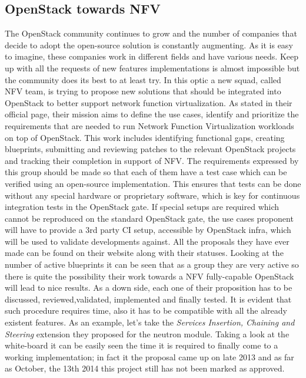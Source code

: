 \subsection{OpenStack towards NFV}
The OpenStack community continues to grow and the number of companies that decide to adopt the open-source solution is constantly augmenting. As it is easy to imagine, these companies work in different fields and have various needs. Keep up with all the requests of new features implementations is almost impossible but the community does its best to at least try. In this optic a new squad, called NFV team, is trying to propose new solutions that should be integrated into OpenStack to better support network function virtualization.
As stated in their official page\cite{NFVteam}, their mission aims to define the use cases, identify and prioritize the requirements that are needed to run Network Function Virtualization workloads on top of OpenStack. This work includes identifying functional gaps, creating blueprints, submitting and reviewing patches to the relevant OpenStack projects and tracking their completion in support of NFV. The requirements expressed by this group should be made so that each of them have a test case which can be verified using an open-source implementation. This ensures that tests can be done without any special hardware or proprietary software, which is key for continuous integration tests in the OpenStack gate. If special setups are required which cannot be reproduced on the standard OpenStack gate, the use cases proponent will have to provide a 3rd party CI setup, accessible by OpenStack infra, which will be used to validate developments against. All the proposals they have ever made can be found on their website\cite{NFVteam} along with their statuses. Looking at the number of active blueprints it can be seen that as a group they are very active so there is quite the possibility their work towards a NFV fully-capable OpenStack will lead to nice results. As a down side, each one of their proposition has to be discussed, reviewed,validated, implemented and finally tested. It is evident that such procedure requires time, also it has to be compatible with all the already existent features.
As an example, let's take the \textit{Services Insertion, Chaining and Steering}\cite{neutronsteeringofficial} extension they proposed for the neutron module. Taking a look at the white-board it can be easily seen the time it is required to finally come to a working implementation; in fact it the proposal came up on late 2013 and as far as October, the 13th 2014 this project still has not been marked as approved.

